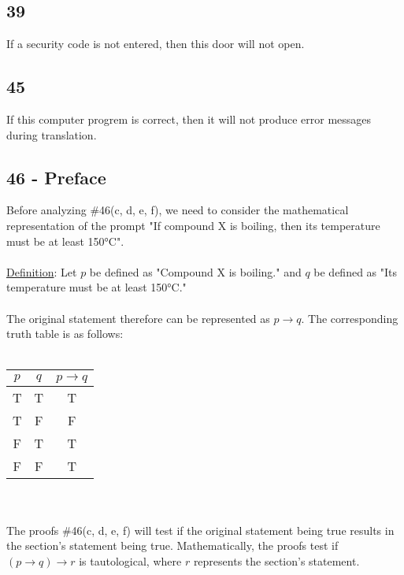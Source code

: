 \documentclass[12pt]{article}
\begin{document}
\subsection*{39}
If a security code is not entered, then this door will not open.

\subsection*{45}
If this computer progrem is correct, then it will not produce error messages during translation.

\subsection*{46 - Preface}
Before analyzing \#46(c, d, e, f), we need to consider the mathematical representation of the prompt "If compound X is boiling, then its temperature must be at least 150°C".
\\ \\
\underline{Definition}: Let $p$ be defined as "Compound X is boiling." and $q$ be defined as "Its temperature must be at least 150°C." 
\\ \\
The original statement therefore can be represented as $p \rightarrow q$. The corresponding truth table is as follows: \\ \\
\begin{tabular}{c c|c}
  $p$ & $q$ & $p \rightarrow q$ \\
  \hline
  T&T&T \\
  T&F&F \\
  F&T&T \\
  F&F&T \\
\end{tabular}
\\ \\
The proofs \#46(c, d, e, f) will test if the original statement being true results in the section's statement being true. Mathematically, the proofs test if $(p \rightarrow q) \rightarrow r$ is tautological, where $r$ represents the section's statement.
\end{document}
